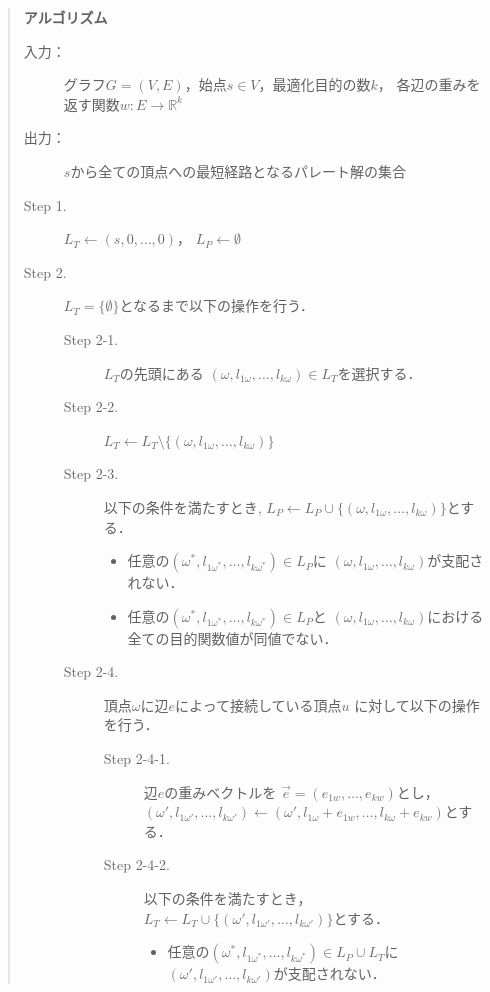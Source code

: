 \documentclass[12pt]{optlab-bachelor}
\begin{document}
\begin{quote}
  \textbf{アルゴリズム}
  \begin{description}
    \item[入力：] グラフ$G=(V,E)$，始点$s \in V$，最適化目的の数$k$，
    各辺の重みを返す関数$w : E \to \mathbb{R}^k$
    \item[出力：] $s$から全ての頂点への最短経路となるパレート解の集合
    \item[Step 1.] $L_T \leftarrow (s,0,\ldots,0)$，
    $L_P \leftarrow \emptyset$
    \item[Step 2.] $L_T = \{\emptyset\}$となるまで以下の操作を行う．
    \begin{description}
      \item[Step 2-1.] $L_T$の先頭にある
      $(\omega,l_{1\omega},\ldots,l_{k\omega})\in L_T$を選択する．
      \item[Step 2-2.] $L_T \leftarrow L_T \setminus
      \{ (\omega,l_{1\omega},\ldots,l_{k\omega}) \}$
      \item[Step 2-3.] 以下の条件を満たすとき,
      $L_P \leftarrow L_P \cup \{(\omega,l_{1\omega},\ldots,l_{k\omega})\}$とする．
      \begin{itemize}
        \item 任意の$(\omega^*,l_{1\omega^*},\ldots,l_{k\omega^*})\in L_P$に
        $(\omega,l_{1\omega},\ldots,l_{k\omega})$が支配されない．
        \item 任意の$(\omega^*,l_{1\omega^*},\ldots,l_{k\omega^*}) \in L_P$と
        $(\omega,l_{1\omega},\ldots,l_{k\omega})$における全ての目的関数値が同値でない．
      \end{itemize}
      \item[Step 2-4.] 頂点$\omega$に辺$e$によって接続している頂点$u$
      に対して以下の操作を行う．
      \begin{description}
        \item[Step 2-4-1.] 辺$e$の重みベクトルを
        $\vec{e} = (e_{1w},\ldots,e_{kw})$とし，
        $(\omega',l_{1\omega'},\ldots,l_{k\omega'}) \leftarrow
        (\omega',l_{1\omega}+e_{1w},\ldots,l_{k\omega}+e_{kw})$とする．
        \item[Step 2-4-2.] 以下の条件を満たすとき，
        $L_T \leftarrow L_T \cup \{(\omega',l_{1\omega'},\ldots,l_{k\omega'})\}$とする．
        \begin{itemize}
          \item 任意の$(\omega^*,l_{1\omega^*},\ldots,l_{k\omega^*})\in L_P \cup L_T$に
          $(\omega',l_{1\omega'},\ldots,l_{k\omega'})$が支配されない．

\end{itemize}
\end{description}
\end{description}
\end{description}
\end{quote}
\end{document}
